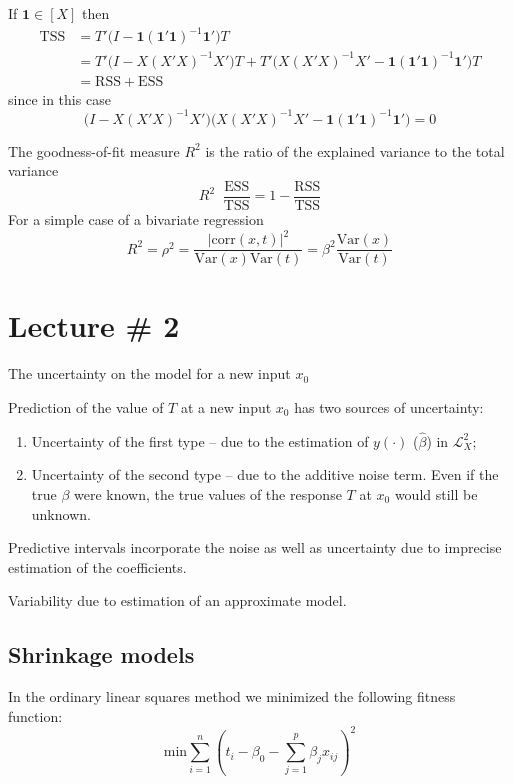 \documentclass[a4paper]{article}
\newcommand{\clo}[1]{{\left [ #1 \right ]}}
\newcommand{\brac}[1]{{\left ( #1 \right )}}
\newcommand{\abs}[1]{{\left | #1 \right |}}
\newcommand{\Lcal}{\mathcal{L}}
\newcommand{\Var}[0]{{\text{Var}}}
\newcommand{\RSS}{\text{RSS}}
\newcommand{\one}{\mathbf{1}}
\newcommand{\defn}{\mathop{\overset{\Delta}{=}}\nolimits}
\begin{document}
If $\one\in \clo{X}$ then
\begin{align*}
	\text{TSS} &= T' \bigr(I - \one(\one'\one)^{-1}\one'\bigl) T \\
	&= T' \bigl(I - X(X'X)^{-1}X'\bigr) T + T' \bigl( X(X'X)^{-1}X' - \one(\one'\one)^{-1}\one'\bigr) T \\
	&= \RSS + \text{ESS}
\end{align*}
since in this case
\[\bigl(I - X(X'X)^{-1}X'\bigr)\bigl( X(X'X)^{-1}X' - \one(\one'\one)^{-1}\one'\bigr) = 0\]

The goodness-of-fit measure $R^2$ is the ratio of the explained variance to the
total variance
\[R^2 \defn \frac{\text{ESS}}{\text{TSS}} = 1 - \frac{\RSS}{\text{TSS}} \]
For a simple case of a bivariate regression
\[R^2 = \rho^2 = \frac{\abs{\text{corr}(x,t)}^2}{\Var(x)\Var(t)} = \beta^2 \frac{\Var(x)}{\Var(t)}\]




\clearpage
\section{Lecture \# 2} %
\label{sec:lecture_2}

The uncertainty on the model for a new input $x_0$ 

Prediction of the value of $T$ at a new input $x_0$ has two sources of uncertainty:
\begin{enumerate}
	\item Uncertainty of the first type -- due to the estimation of $y(\cdot)$
	($\hat{\beta}$) in $\Lcal^2_X$;
	\item Uncertainty of the second type -- due to the additive noise term. Even
	if the true $\beta$ were known, the true values of the response $T$ at $x_0$
	would still be unknown.
\end{enumerate}
Predictive intervals incorporate the noise as well as uncertainty due to imprecise
estimation of the coefficients.

Variability due to estimation of an approximate model.

\subsection{Shrinkage models} %
\label{sub:shrinkage_models}

In the ordinary linear squares method we minimized the following fitness function:
\[\text{min} \sum_{i=1}^n \brac{t_i - \beta_0 - \sum_{j=1}^p \beta_j x_{ij}}^2\]
\end{document}
